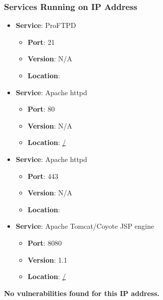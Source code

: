 \documentclass{article}
\begin{document}
\subsubsection*{Services Running on IP Address}

\begin{itemize}
    
        \item \textbf{Service}: ProFTPD
        \begin{itemize}
            \item \textbf{Port}: 21
            \item \textbf{Version}:  N/A 
            \item \textbf{Location}: \href{  }{  }
        \end{itemize}
    
        \item \textbf{Service}: Apache httpd
        \begin{itemize}
            \item \textbf{Port}: 80
            \item \textbf{Version}:  N/A 
            \item \textbf{Location}: \href{ / }{ / }
        \end{itemize}
    
        \item \textbf{Service}: Apache httpd
        \begin{itemize}
            \item \textbf{Port}: 443
            \item \textbf{Version}:  N/A 
            \item \textbf{Location}: \href{  }{  }
        \end{itemize}
    
        \item \textbf{Service}: Apache Tomcat/Coyote JSP engine
        \begin{itemize}
            \item \textbf{Port}: 8080
            \item \textbf{Version}:  1.1 
            \item \textbf{Location}: \href{ / }{ / }
        \end{itemize}
    
\end{itemize}


\textbf{No vulnerabilities found for this IP address.}
\end{document}

